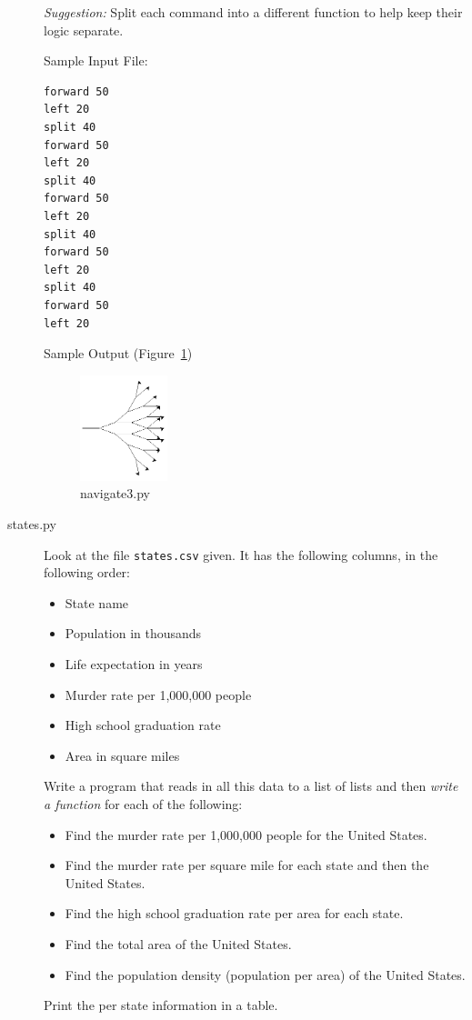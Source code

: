 \documentclass[11pt]{cselabheader}
\begin{document}
\begin{description}
    \emph{Suggestion:} Split each command into a different function to help keep their logic separate.

    Sample Input File:
    \begin{lstlisting}[style=python]
forward 50
left 20
split 40
forward 50
left 20
split 40
forward 50
left 20
split 40
forward 50
left 20
split 40
forward 50
left 20
    \end{lstlisting}

    Sample Output (Figure~\ref{fig:nav})
    \begin{figure}[!h]
      \centering
      \includegraphics[width=1.0in]{img/nav3_example}
      \caption{navigate3.py}
      \label{fig:nav}
    \end{figure}

  \item[states.py]
    Look at the file \texttt{states.csv} given. It has the following columns, in
    the following order:
    \begin{itemize}
      \item State name
      \item Population in thousands
      \item Life expectation in years
      \item Murder rate per 1,000,000 people
      \item High school graduation rate
      \item Area in square miles
    \end{itemize}

    Write a program that reads in all this data to a list of lists and then
    \emph{write a function} for each of the following:
    \begin{itemize}
      \item Find the murder rate per 1,000,000 people for the United States.
      \item Find the murder rate per square mile for each state and then the
        United States.
      \item Find the high school graduation rate per area for each state.
      \item Find the total area of the United States.
      \item Find the population density (population per area) of the United
        States.
    \end{itemize}

    Print the per state information in a table.
\end{description}
\end{document}

